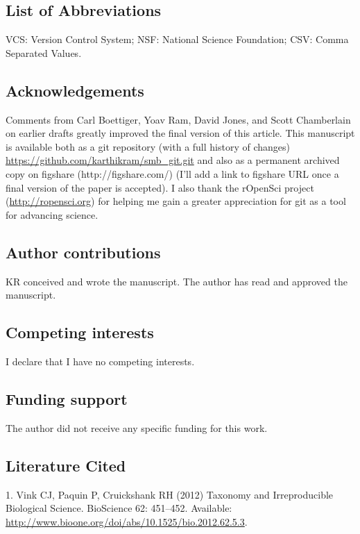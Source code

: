 \documentclass[]{article}
\begin{document}
\subsection{List of Abbreviations}

VCS: Version Control System; NSF: National Science Foundation; CSV:
Comma Separated Values.

\subsection{Acknowledgements}

Comments from Carl Boettiger, Yoav Ram, David Jones, and Scott
Chamberlain on earlier drafts greatly improved the final version of this
article. This manuscript is available both as a git repository (with a
full history of changes)
\href{https://github.com/karthikram/smb\_git.git}{https://github.com/karthikram/smb\_git.git}
and also as a permanent archived copy on figshare (http://figshare.com/)
(I'll add a link to figshare URL once a final version of the paper is
accepted). I also thank the rOpenSci project
(\href{http://ropensci.org}{http://ropensci.org}) for helping me gain a
greater appreciation for git as a tool for advancing science.

\subsection{Author contributions}

KR conceived and wrote the manuscript. The author has read and approved
the manuscript.

\subsection{Competing interests}

I declare that I have no competing interests.

\subsection{Funding support}

The author did not receive any specific funding for this work.

\subsection{Literature Cited}

1. Vink CJ, Paquin P, Cruickshank RH (2012) Taxonomy and Irreproducible
Biological Science. BioScience 62: 451--452. Available:
\href{http://www.bioone.org/doi/abs/10.1525/bio.2012.62.5.3}{http://www.bioone.org/doi/abs/10.1525/bio.2012.62.5.3}.
\end{document}

